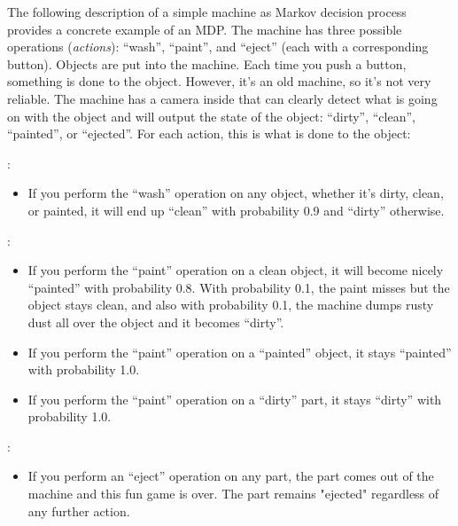 \begin{examplebox}
The following description of a simple machine as Markov decision
process provides a concrete example of an MDP.  
%
%
The machine has three possible operations ({\em actions}): ``wash'',
``paint'', and ``eject'' (each with a corresponding button). Objects
are put into the machine. Each time you push a button, something is
done to the object. However, it's an old machine, so it's not very
reliable. The machine has a camera inside that can clearly detect what
is going on with the object and will output the state of the object:
``dirty'', ``clean'', ``painted'', or ``ejected''.  For each action,
this is what is done to the object:

:

\begin{itemize}
\item If you perform the ``wash'' operation on any object, whether
  it's dirty, clean, or painted, it will end up ``clean'' with
  probability 0.9 and ``dirty'' otherwise.
\end{itemize}

:

\begin{itemize}
\item If you perform the ``paint'' operation on a clean object, it
  will become nicely ``painted'' with probability 0.8. With
  probability 0.1, the paint misses but the object stays clean, and
  also with probability 0.1, the machine dumps rusty dust all over the
  object and it becomes ``dirty''.
\item If you perform the ``paint'' operation on a ``painted'' object,
  it stays ``painted'' with probability 1.0.
\item If you perform the ``paint'' operation on a ``dirty'' part, it
  stays ``dirty'' with probability 1.0.
\end{itemize}

:

\begin{itemize}
\item If you perform an ``eject'' operation on any part, the part
  comes out of the machine and this fun game is over. The part remains
  "ejected" regardless of any further action.
\end{itemize}


\end{examplebox}
